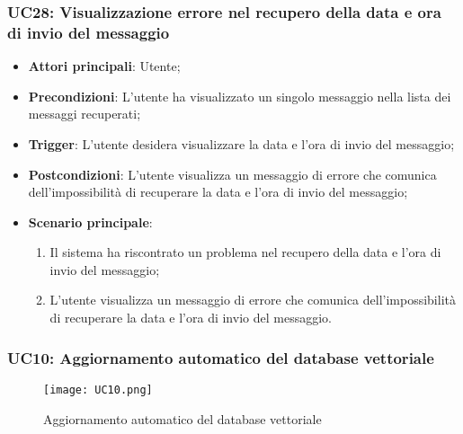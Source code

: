 \subsubsection{UC28: Visualizzazione errore nel recupero della data e ora di invio del messaggio}
\begin{itemize}
    \item \textbf{Attori principali}: Utente;
    \item \textbf{Precondizioni}: L'utente ha visualizzato un singolo messaggio nella lista dei messaggi recuperati;
    \item \textbf{Trigger}: L'utente desidera visualizzare la data e l'ora di invio del messaggio;
    \item \textbf{Postcondizioni}: L'utente visualizza un messaggio di errore che comunica dell'impossibilità di recuperare la data e l'ora di invio del messaggio;
    \item \textbf{Scenario principale}:
    \begin{enumerate}
        \item Il sistema ha riscontrato un problema nel recupero della data e l'ora di invio del messaggio;
        \item L'utente visualizza un messaggio di errore che comunica dell'impossibilità di recuperare la data e l'ora di invio del messaggio.
    \end{enumerate}
\end{itemize}

\hypertarget{UC10}{}
\subsubsection{UC10: Aggiornamento automatico del database vettoriale}

\begin{figure}[h]
    \centering
    \texttt{[image: UC10.png]}
    \caption{Aggiornamento automatico del database vettoriale}
\end{figure}

